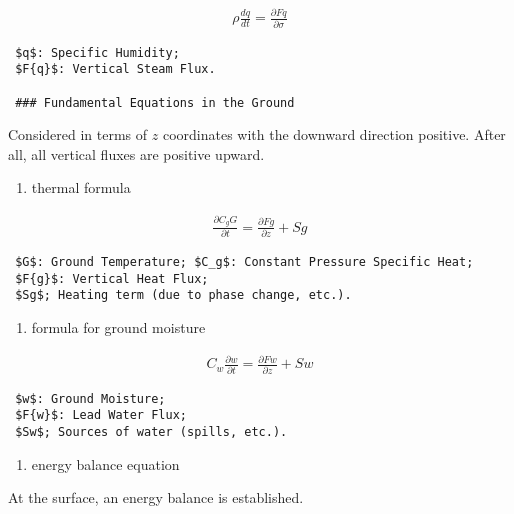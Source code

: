 \begin{eqnarray}
  \rho \frac{dq}{dt} = \frac{\partial Fq}{\partial \sigma}
\end{eqnarray}

\begin{verbatim}
 $q$: Specific Humidity;
 $F{q}$: Vertical Steam Flux.

 ### Fundamental Equations in the Ground
\end{verbatim}

Considered in terms of \(z\) coordinates with the downward direction
positive. After all, all vertical fluxes are positive upward.

\begin{enumerate}
\def\labelenumi{\arabic{enumi}.}
\setcounter{enumi}{3}
\tightlist
\item
  thermal formula
\end{enumerate}

\begin{eqnarray}
  \frac{\partial C_g G}{\partial t} = \frac{\partial Fg}{\partial z} + Sg
\end{eqnarray}

\begin{verbatim}
 $G$: Ground Temperature; $C_g$: Constant Pressure Specific Heat;
 $F{g}$: Vertical Heat Flux;
 $Sg$; Heating term (due to phase change, etc.).
\end{verbatim}

\begin{enumerate}
\def\labelenumi{\arabic{enumi}.}
\setcounter{enumi}{4}
\tightlist
\item
  formula for ground moisture
\end{enumerate}

\begin{eqnarray}
  C_w \frac{\partial w}{\partial t} = \frac{\partial Fw}{\partial z} + Sw
\end{eqnarray}

\begin{verbatim}
 $w$: Ground Moisture;
 $F{w}$: Lead Water Flux;
 $Sw$; Sources of water (spills, etc.).
\end{verbatim}

\begin{enumerate}
\def\labelenumi{\arabic{enumi}.}
\setcounter{enumi}{5}
\tightlist
\item
  energy balance equation
\end{enumerate}

At the surface, an energy balance is established.

